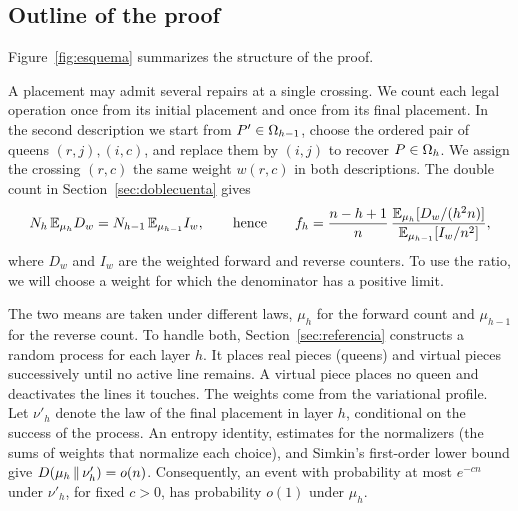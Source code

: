 \subsection{Outline of the proof}\label{subsec:idea}

Figure~\ref{fig:esquema} summarizes the structure of the proof.

A placement may admit several repairs at a single crossing. We count each legal operation once from its
initial placement and once from
its final placement. In the second description we start from $P'\in\Omega_{h-1}$, choose the ordered pair of
queens $(r,j),(i,c)$, and
replace them by $(i,j)$ to recover $P\in\Omega_h$. We assign the crossing $(r,c)$ the same weight $w(r,c)$ in
both descriptions. The
double count in Section~\ref{sec:doblecuenta} gives \[
 N_h\,\mathbb{E}_{\mu_h}D_w=N_{h-1}\,\mathbb{E}_{\mu_{h-1}}I_w,\qquad\text{hence}\qquad
 f_h=\frac{n-h+1}{n}\,\frac{\mathbb{E}_{\mu_h}[D_w/(h^2n)]}{\mathbb{E}_{\mu_{h-1}}[I_w/n^2]},
\] where $D_w$ and $I_w$ are the weighted forward and reverse counters. To use the ratio, we will choose a
weight for which the
denominator has a positive limit.

The two means are taken under different laws, $\mu_h$ for the forward count and $\mu_{h-1}$ for the reverse
count. To handle both,
Section~\ref{sec:referencia} constructs a random process for each layer $h$. It places real pieces (queens)
and virtual pieces
successively until no active line remains. A virtual piece places no queen and deactivates the lines it
touches. The weights come from
the variational profile. Let $\nu'_h$ denote the law of the final placement in layer $h$, conditional on the
success of the process. An
entropy identity, estimates for the normalizers (the sums of weights that normalize each choice), and
Simkin's first-order lower bound
give $D(\mu_h\,\Vert\,\nu'_h)=o(n)$. Consequently, an event with probability at most $e^{-cn}$ under $\nu'_h$,
for fixed $c>0$, has
probability $o(1)$ under $\mu_h$.
